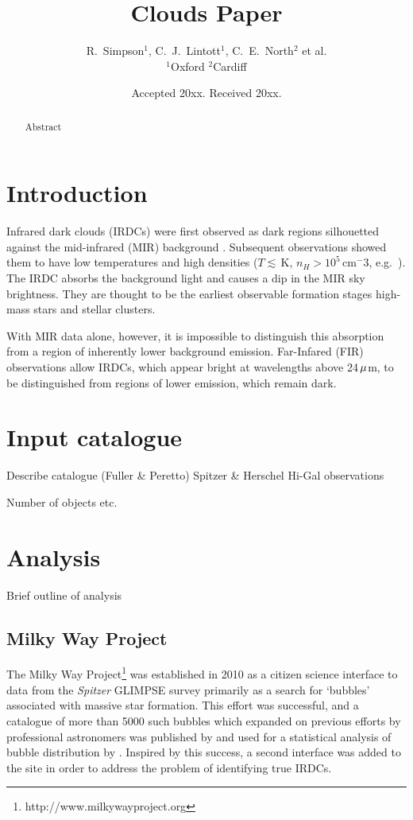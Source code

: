 \documentclass[a4,useAMS,usenatbib]{mn2e}
\title{Clouds Paper}
\author[The world]{R.~Simpson$^1$, C.~J.~Lintott$^1$, C.~E.~North$^2$ et al.
\\
$^1$Oxford
$^2$Cardiff
}
\def\mic{$\umu$m}
\begin{document}
\date{Accepted 20xx. Received 20xx.}

\pagerange{\pageref{firstpage}--\pageref{lastpage}} 

\maketitle

\label{firstpage}

\begin{abstract}
Abstract
\end{abstract}

\section{Introduction}
Infrared dark clouds (IRDCs) were first observed as dark regions
silhouetted against the mid-infrared (MIR) background
\citep{Wilcock2011}. Subsequent observations showed them to have low
temperatures and high densities ($T\lesssim$\,K, $n_H > 10^5$\,cm$^-3$,
e.g.~\citet{Egan98,Carey98,HennebellePerault02}). The IRDC absorbs the
background light and causes a dip in the MIR sky brightness. They are
thought to be the earliest observable formation stages high-mass stars
and stellar clusters.

With MIR data alone, however, it is impossible to distinguish this
absorption from a region of inherently lower background
emission. Far-Infared (FIR) observations allow IRDCs, which appear
bright at wavelengths above 24\,\mic, to be distinguished from regions
of lower emission, which remain dark. 


\section{Input catalogue}
Describe catalogue (Fuller \& Peretto)
Spitzer \& Herschel Hi-Gal observations

Number of objects etc.

\section{Analysis}
Brief outline of analysis

\subsection{Milky Way Project}
The Milky Way Project\footnote{http://www.milkywayproject.org} was established in 2010 as a citizen science interface to data from the \emph{Spitzer} GLIMPSE survey primarily as a search for `bubbles' associated with massive star formation. This effort was successful, and a catalogue of more than 5000 such bubbles which expanded on previous efforts by professional astronomers was published by \citet{Simpsonetal} and used for a statistical analysis of bubble distribution by \citet{Kendrewetal}. Inspired by this success, a second interface was added to the site in order to address the problem of identifying true IRDCs.
\end{document}
